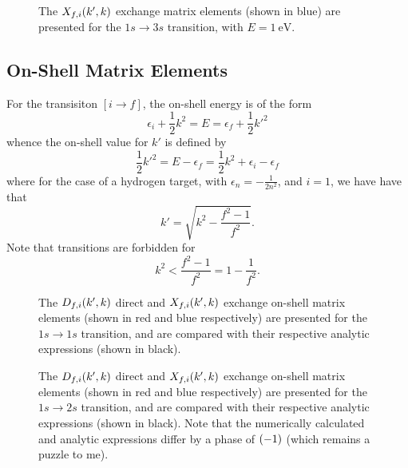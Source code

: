 \documentclass{article}
\begin{document}
\begin{figure}[h]
  \begin{center}
    
  \end{center}
  \caption[Exchange Matrix Elements 1s-3s]{
    The $X_{f, i}(k', k)$ exchange matrix elements (shown in blue) are
    presented for the $1s \to 3s$ transition, with $E = \SI{1}{\eV}$.
  }
  \label{fig:exc-me-1s-3s}
\end{figure}

\clearpage

\subsection{On-Shell Matrix Elements}
\label{sec:on-me}

For the transisiton $[i \to f]$, the on-shell energy is of the form
\begin{equation*}
  \epsilon_{i}
  +
  \dfrac{1}{2}
  k^{2}
  =
  E
  =
  \epsilon_{f}
  +
  \dfrac{1}{2}
  k'^{2}
\end{equation*}
whence the on-shell value for $k'$ is defined by
\begin{equation*}
  \dfrac{1}{2}
  k'^{2}
  =
  E
  -
  \epsilon_{f}
  =
  \dfrac{1}{2}
  k^{2}
  +
  \epsilon_{i}
  -
  \epsilon_{f}
\end{equation*}
where for the case of a hydrogen target, with
$\epsilon_{n} = -\tfrac{1}{2n^{2}}$, and $i = 1$, we have have that
\begin{equation*}
  k'
  =
  \sqrt
  {
    k^{2}
    -
    \dfrac{f^{2} - 1}{f^{2}}
  }
  .
\end{equation*}
Note that transitions are forbidden for
\begin{equation*}
  k^{2}
  <
  \dfrac{f^{2} - 1}{f^{2}}
  =
  1
  -
  \dfrac{1}{f^{2}}
  .
\end{equation*}

\begin{figure}[h]
  \begin{center}
    
  \end{center}
  \caption[On-Shell Matrix Elements 1s-1s]{
    The $D_{f, i}(k', k)$ direct and $X_{f, i}(k', k)$ exchange on-shell
    matrix elements (shown in red and blue respectively) are presented for the
    $1s \to 1s$ transition, and are compared with their respective analytic
    expressions (shown in black).
  }
  \label{fig:on-me-1s-1s}
\end{figure}

\begin{figure}[h]
  \begin{center}
    
  \end{center}
  \caption[On-Shell Matrix Elements 1s-2s]{
    The $D_{f, i}(k', k)$ direct and $X_{f, i}(k', k)$ exchange on-shell
    matrix elements (shown in red and blue respectively) are presented for the
    $1s \to 2s$ transition, and are compared with their respective analytic
    expressions (shown in black).
    Note that the numerically calculated and analytic expressions differ by a
    phase of $(-1)$ (which remains a puzzle to me).
  }
  \label{fig:on-me-1s-2s}
\end{figure}
\end{document}
